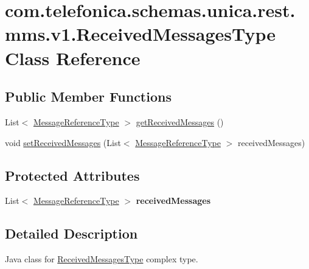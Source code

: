 \hypertarget{classcom_1_1telefonica_1_1schemas_1_1unica_1_1rest_1_1mms_1_1v1_1_1ReceivedMessagesType}{
\section{com.telefonica.schemas.unica.rest.mms.v1.ReceivedMessagesType Class Reference}
\label{classcom_1_1telefonica_1_1schemas_1_1unica_1_1rest_1_1mms_1_1v1_1_1ReceivedMessagesType}
}
\subsection*{Public Member Functions}
\begin{DoxyCompactItemize}
\item 
List$<$ \hyperlink{classcom_1_1telefonica_1_1schemas_1_1unica_1_1rest_1_1mms_1_1v1_1_1MessageReferenceType}{MessageReferenceType} $>$ \hyperlink{classcom_1_1telefonica_1_1schemas_1_1unica_1_1rest_1_1mms_1_1v1_1_1ReceivedMessagesType_a8c4e57dec897834ac1c1905f8dffc379}{getReceivedMessages} ()
\item 
void \hyperlink{classcom_1_1telefonica_1_1schemas_1_1unica_1_1rest_1_1mms_1_1v1_1_1ReceivedMessagesType_aaf0bba7fa7f97a90142c70017a066237}{setReceivedMessages} (List$<$ \hyperlink{classcom_1_1telefonica_1_1schemas_1_1unica_1_1rest_1_1mms_1_1v1_1_1MessageReferenceType}{MessageReferenceType} $>$ receivedMessages)
\end{DoxyCompactItemize}
\subsection*{Protected Attributes}
\begin{DoxyCompactItemize}
\item 
\hypertarget{classcom_1_1telefonica_1_1schemas_1_1unica_1_1rest_1_1mms_1_1v1_1_1ReceivedMessagesType_a8df173f0faa7123e101ad7b307ea77ae}{
List$<$ \hyperlink{classcom_1_1telefonica_1_1schemas_1_1unica_1_1rest_1_1mms_1_1v1_1_1MessageReferenceType}{MessageReferenceType} $>$ {\bfseries receivedMessages}}
\label{classcom_1_1telefonica_1_1schemas_1_1unica_1_1rest_1_1mms_1_1v1_1_1ReceivedMessagesType_a8df173f0faa7123e101ad7b307ea77ae}

\end{DoxyCompactItemize}


\subsection{Detailed Description}
Java class for \hyperlink{classcom_1_1telefonica_1_1schemas_1_1unica_1_1rest_1_1mms_1_1v1_1_1ReceivedMessagesType}{ReceivedMessagesType} complex type.

